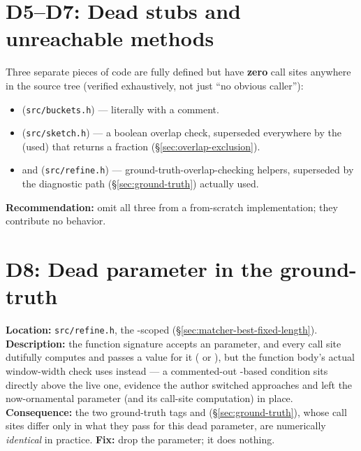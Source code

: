 \section{D5--D7: Dead stubs and unreachable methods}
\label{sec:d5}
\label{sec:d6}
\label{sec:d7}
Three separate pieces of code are fully defined but have \textbf{zero} call sites anywhere in the
source tree (verified exhaustively, not just ``no obvious caller''):
\begin{itemize}
  \item {} (\texttt{src/buckets.h}) --- literally  with a
     comment.
  \item {} (\texttt{src/sketch.h}) --- a boolean overlap check,
    superseded everywhere by the (used)  that returns a fraction
    (\S\ref{sec:overlap-exclusion}).
  \item {} and 
    (\texttt{src/refine.h}) --- ground-truth-overlap-checking helpers, superseded by the
     diagnostic path (\S\ref{sec:ground-truth}) actually used.
\end{itemize}
\textbf{Recommendation:} omit all three from a from-scratch implementation; they contribute no
behavior.

\section{D8: Dead  parameter in the ground-truth }
\label{sec:d8}
\textbf{Location:} \texttt{src/refine.h}, the -scoped 
(\S\ref{sec:matcher-best-fixed-length}). \textbf{Description:} the function signature accepts an
 parameter, and every call site dutifully computes and passes a value for it
( or ), but the function body's actual window-width check uses
 instead --- a commented-out -based condition sits directly above the live
one, evidence the author switched approaches and left the now-ornamental parameter (and its
call-site computation) in place. \textbf{Consequence:} the two ground-truth tags
 and  (\S\ref{sec:ground-truth}), whose call sites differ only
in what they pass for this dead parameter, are numerically \emph{identical} in practice.
\textbf{Fix:} drop the parameter; it does nothing.

